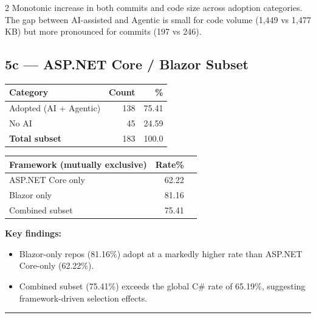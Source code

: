 \documentclass[10pt,a4paper]{article}
\begin{document}
\begin{multicols}{2}
\vspace{2pt}
{\small Monotonic increase in both commits and code size across adoption
categories. The gap between AI-assisted and Agentic is small for code
volume (1,449 vs 1,477 KB) but more pronounced for commits (197 vs 246).}

\columnbreak

\subsection*{5c --- ASP.NET Core / Blazor Subset}

\vspace{2pt}
\begin{tabular}{@{}lrr@{}}
\toprule
Category & Count & \% \\
\midrule
Adopted (AI + Agentic) & 138 & 75.41 \\
No AI                  &  45 & 24.59 \\
\midrule
\textbf{Total subset}  & 183 & 100.0 \\
\bottomrule
\end{tabular}

\vspace{4pt}
\begin{tabular}{@{}lrr@{}}
\toprule
Framework (mutually exclusive) & Rate\% \\
\midrule
ASP.NET Core only & 62.22 \\
Blazor only       & 81.16 \\
Combined subset   & 75.41 \\
\bottomrule
\end{tabular}

\vspace{4pt}
\textbf{Key findings:}
\begin{itemize}\setlength\itemsep{0pt}
  \item Blazor-only repos (81.16\%) adopt at a markedly higher rate than
        ASP.NET Core-only (62.22\%).
  \item Combined subset (75.41\%) exceeds the global C\# rate of 65.19\%,
        suggesting framework-driven selection effects.
\end{itemize}

\end{multicols}

\vspace{4pt}
\hrule
\vspace{4pt}
\end{document}
